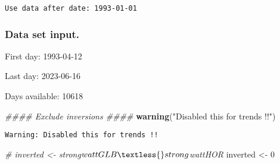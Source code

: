 \documentclass[
  10pt,
  a4paper,oneside]{article}
\newenvironment{Shaded}{\begin{snugshade}}{\end{snugshade}}
\newcommand{\CommentTok}[1]{\textcolor[rgb]{0.56,0.35,0.01}{\textit{#1}}}
\newcommand{\DecValTok}[1]{\textcolor[rgb]{0.00,0.00,0.81}{#1}}
\newcommand{\ErrorTok}[1]{\textcolor[rgb]{0.64,0.00,0.00}{\textbf{#1}}}
\newcommand{\KeywordTok}[1]{\textcolor[rgb]{0.13,0.29,0.53}{\textbf{#1}}}
\newcommand{\NormalTok}[1]{#1}
\newcommand{\OperatorTok}[1]{\textcolor[rgb]{0.81,0.36,0.00}{\textbf{#1}}}
\newcommand{\StringTok}[1]{\textcolor[rgb]{0.31,0.60,0.02}{#1}}
\begin{document}
\begin{verbatim}
Use data after date: 1993-01-01 
\end{verbatim}

\begin{Shaded}
\end{Shaded}

\hypertarget{data-set-input.}{%
\subsubsection{Data set input.}\label{data-set-input.}}

First day: 1993-04-12

Last day: 2023-06-16

Days available: 10618

\begin{Shaded}
\begin{Highlighting}[]
\CommentTok{\#\#\#\# Exclude inversions \#\#\#\#}
\KeywordTok{warning}\NormalTok{(}\StringTok{"Disabled this for trends !!"}\NormalTok{)}
\end{Highlighting}
\end{Shaded}

\begin{verbatim}
Warning: Disabled this for trends !!
\end{verbatim}

\begin{Shaded}
\begin{Highlighting}[]
\CommentTok{\# inverted \textless{}{-} strong$wattGLB \textless{} strong$wattHOR}
\NormalTok{inverted \textless{}{-}}\StringTok{ }\DecValTok{0}
\end{Highlighting}
\end{Shaded}
\end{document}
